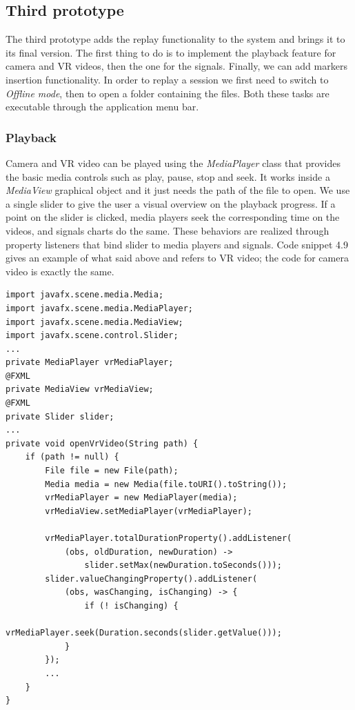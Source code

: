 \documentclass[binding=0.6cm,LaM]{sapthesis}
\begin{document}
\subsection{Third prototype}
The third prototype adds the replay functionality to the system and brings it to its final version. The first thing to do is to implement the playback feature for camera and VR videos, then the one for the signals. Finally, we can add markers insertion functionality.
In order to replay a session we first need to switch to \textit{Offline mode}, then to open a folder containing the files. Both these tasks are executable through the application menu bar. 

\subsubsection{Playback}
Camera and VR video can be played using the \textit{MediaPlayer} class that provides the basic media controls such as play, pause, stop and seek. It works inside a \textit{MediaView} graphical object and it just needs the path of the file to open. 
We use a single slider to give the user a visual overview on the playback progress. If a point on the slider is clicked, media players seek the corresponding time on the videos, and signals charts do the same. These behaviors are realized through property listeners that bind slider to media players and signals. Code snippet 4.9 gives an example of what said above and refers to VR video; the code for camera video is exactly the same.

\begin{lstlisting}[caption={Play video}, captionpos=b]
import javafx.scene.media.Media;
import javafx.scene.media.MediaPlayer;
import javafx.scene.media.MediaView;
import javafx.scene.control.Slider;
...
private MediaPlayer vrMediaPlayer;
@FXML
private MediaView vrMediaView;
@FXML
private Slider slider;
...
private void openVrVideo(String path) {
	if (path != null) {
		File file = new File(path);
		Media media = new Media(file.toURI().toString());
		vrMediaPlayer = new MediaPlayer(media);
		vrMediaView.setMediaPlayer(vrMediaPlayer);
            
		vrMediaPlayer.totalDurationProperty().addListener(
			(obs, oldDuration, newDuration) -> 				
				slider.setMax(newDuration.toSeconds()));
		slider.valueChangingProperty().addListener(
			(obs, wasChanging, isChanging) -> {
				if (! isChanging) {
           			vrMediaPlayer.seek(Duration.seconds(slider.getValue()));
            }
		});
		...
	}
}
\end{lstlisting}
\end{document}
